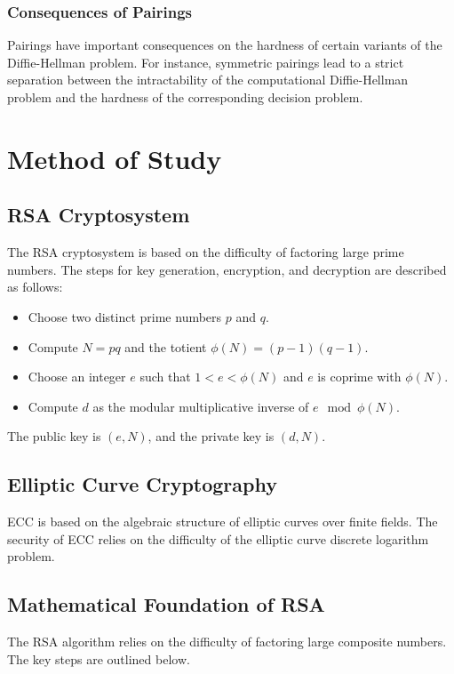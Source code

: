 \documentclass[12pt]{report}
\numberwithin{equation}{chapter}
\begin{document}
\subsection*{Consequences of Pairings}
Pairings have important consequences on the hardness of certain variants of the Diffie-Hellman problem. For instance, symmetric pairings lead to a strict separation between the intractability of the computational Diffie-Hellman problem and the hardness of the corresponding decision problem.


\newpage
\chapter{Method of Study}

\section{RSA Cryptosystem}
The RSA cryptosystem is based on the difficulty of factoring large prime numbers. The steps for key generation, encryption, and decryption are described as follows:
\begin{itemize}
    \item Choose two distinct prime numbers \( p \) and \( q \).
    \item Compute \( N = pq \) and the totient \( \phi(N) = (p-1)(q-1) \).
    \item Choose an integer \( e \) such that \( 1 < e < \phi(N) \) and \( e \) is coprime with \( \phi(N) \).
    \item Compute \( d \) as the modular multiplicative inverse of \( e \mod \phi(N) \).
\end{itemize}
The public key is \( (e, N) \), and the private key is \( (d, N) \).

\section{Elliptic Curve Cryptography}
ECC is based on the algebraic structure of elliptic curves over finite fields. The security of ECC relies on the difficulty of the elliptic curve discrete logarithm problem.

\section{Mathematical Foundation of RSA}

The RSA algorithm relies on the difficulty of factoring large composite numbers. The key steps are outlined below.
\end{document}
